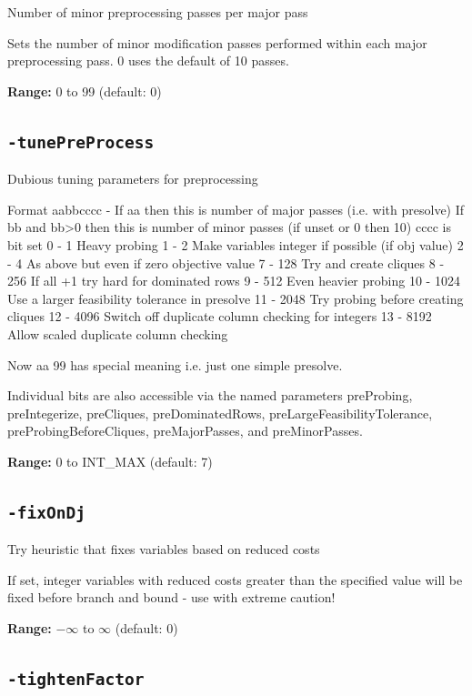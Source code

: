 \documentclass[11pt,a4paper]{article}
\begin{document}
Number of minor preprocessing passes per major pass

Sets the number of minor modification passes performed within each major preprocessing pass. 0 uses the default of 10 passes.

\textbf{Range:} 0 to 99 (default: 0)

\subsection*{\texttt{-tunePreProcess}}

Dubious tuning parameters for preprocessing

Format aabbcccc - 
 If aa then this is number of major passes (i.e. with presolve) 
 If bb and bb>0 then this is number of minor passes (if unset or 0 then 10) 
 cccc is bit set 
 0 - 1 Heavy probing 
 1 - 2 Make variables integer if possible (if obj value)
 2 - 4 As above but even if zero objective value
 7 - 128 Try and create cliques
 8 - 256 If all +1 try hard for dominated rows
 9 - 512 Even heavier probing 
 10 - 1024 Use a larger feasibility tolerance in presolve
 11 - 2048 Try probing before creating cliques
 12 - 4096 Switch off duplicate column checking for integers 
 13 - 8192 Allow scaled duplicate column checking 
 
     Now aa 99 has special meaning i.e. just one simple presolve. 

Individual bits are also accessible via the named parameters preProbing, preIntegerize, preCliques, preDominatedRows, preLargeFeasibilityTolerance, preProbingBeforeCliques, preMajorPasses, and preMinorPasses.

\textbf{Range:} 0 to INT\_MAX (default: 7)

\subsection*{\texttt{-fixOnDj}}

Try heuristic that fixes variables based on reduced costs

If set, integer variables with reduced costs greater than the specified value will be fixed before branch and bound - use with extreme caution!

\textbf{Range:} $-\infty$ to $\infty$ (default: 0)

\subsection*{\texttt{-tightenFactor}}
\end{document}
